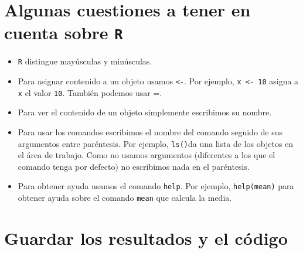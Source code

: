 \documentclass[]{book}
\begin{document}
\section{\texorpdfstring{Algunas cuestiones a tener en cuenta sobre
\texttt{R}}{Algunas cuestiones a tener en cuenta sobre R}}\label{algunas-cuestiones-a-tener-en-cuenta-sobre-r}

\begin{itemize}
\item
  \texttt{R} distingue mayúsculas y minúsculas.
\item
  Para asignar contenido a un objeto usamos \texttt{\textless{}-}. Por
  ejemplo, \texttt{x\ \textless{}-\ 10} asigna a \texttt{x} el valor
  \texttt{10}. También podemos usar =.
\item
  Para ver el contenido de un objeto simplemente escribimos su nombre.
\item
  Para usar los comandos escribimos el nombre del comando seguido de sus
  argumentos entre paréntesis. Por ejemplo, \texttt{ls()}da una lista de
  los objetos en el área de trabajo. Como no usamos argumentos
  (diferentes a los que el comando tenga por defecto) no escribimos nada
  en el paréntesis.
\item
  Para obtener ayuda usamos el comando \texttt{help}. Por ejemplo,
  \texttt{help(mean)} para obtener ayuda sobre el comando \texttt{mean}
  que calcula la media.
\end{itemize}

\section{Guardar los resultados y el
código}\label{guardar-los-resultados-y-el-codigo}
\end{document}
